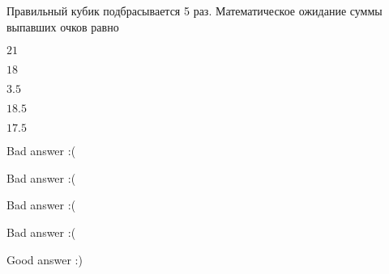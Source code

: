 
\begin{question}
Правильный кубик подбрасывается 5 раз. Математическое ожидание суммы
выпавших очков равно
\begin{answerlist}
  \item \(21\)
  \item \(18\)
  \item \(3.5\)
  \item \(18.5\)
  \item \(17.5\)
\end{answerlist}
\end{question}

\begin{solution}
\begin{answerlist}
  \item Bad answer :(
  \item Bad answer :(
  \item Bad answer :(
  \item Bad answer :(
  \item Good answer :)
\end{answerlist}
\end{solution}

